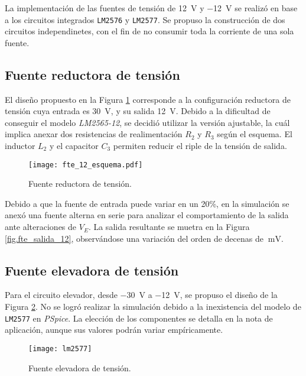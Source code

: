 La implementación de las fuentes de tensión de \SI{12}{\volt} y \SI{-12}{\volt} se realizó en base a los circuitos integrados \texttt{LM2576} y \texttt{LM2577}. Se propuso la construcción de dos circuitos independinetes, con el fin de no consumir toda la corriente de una sola fuente.

\subsection{Fuente reductora de tensión}
El diseño propuesto en la Figura \ref{fig.fte_12} corresponde a la configuración reductora de tensión cuya entrada es \SI{+30}{\volt}, y su salida \SI{+12}{\volt}. Debido a la dificultad de conseguir el modelo \textit{LM2565-12}, se decidió utilizar la versión ajustable, la cuál implica anexar dos resistencias de realimentación $R_2$ y $R_3$ según el esquema. El inductor $L_2$ y el capacitor $C_3$ permiten reducir el riple de la tensión de salida.




\begin{figure}
	\centering
	\texttt{[image: fte\_12\_esquema.pdf]}
	\caption{Fuente reductora de tensión.}
	\label{fig.fte_12}
\end{figure}


Debido a que la fuente de entrada puede variar en un 20\%, en la simulación se anexó una fuente alterna en serie para analizar el comportamiento de la salida ante alteraciones de $V_E$. La salida resultante se muetra en la Figura \ref{fig.fte_salida_12}, observándose una variación del orden de decenas de $\SI{}{\milli\volt}$.





\subsection{Fuente elevadora de tensión}

Para el circuito elevador, desde \SI{-30}{\volt} a \SI{-12}{\volt}, se propuso el diseño de la Figura \ref{fig.fte_elevadora}. 
No se logró realizar la simulación debido a la inexistencia del modelo de \texttt{LM2577} en \emph{PSpice}. 
La elección de los componentes se detalla en la nota de aplicación, aunque sus valores podrán variar empíricamente.

\begin{figure}[H]
	\centering
	\texttt{[image: lm2577]}
	\caption{Fuente elevadora de tensión.}
	\label{fig.fte_elevadora}
\end{figure}

